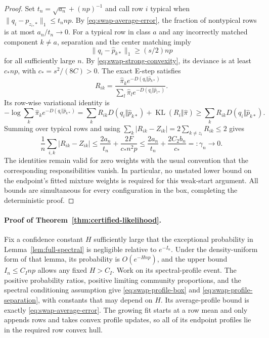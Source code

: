 \begin{proof}
Set $t_n=\sqrt{a_n}+(np)^{-1}$ and call row $i$ typical when
$\|q_i-p_{z_i,*}\|_1\le t_nnp$. By
\eqref{eq:swap-average-error}, the fraction of nontypical rows is at
most $a_n/t_n\to0$. For a typical row in class $a$ and any incorrectly
matched component $k\ne a$, separation and the center matching imply
\[
 \|q_i-\widehat p_{k*}\|_1\ge (s/2)np
\]
for all sufficiently large $n$. By \eqref{eq:swap-strong-convexity},
its deviance is at least $c_*np$, with
$c_*=s^2/(8C)>0$. The exact E-step satisfies
\[
 R_{ik}=\frac{\widehat\pi_ke^{-D(q_i\Vert\widehat p_{k*})}}
               {\sum_l\widehat\pi_le^{-D(q_i\Vert\widehat p_{l*})}}.
\]
Its row-wise variational identity is
\[
 -\log\sum_k\widehat\pi_ke^{-D(q_i\Vert\widehat p_{k*})}
 =\sum_kR_{ik}D(q_i\Vert\widehat p_{k*})
       +\operatorname{KL}(R_i\Vert\widehat\pi)
 \ge\sum_kR_{ik}D(q_i\Vert\widehat p_{k*}).
\]
Summing over typical rows and using
$\sum_k|R_{ik}-Z_{ik}|=2\sum_{k\ne z_i}R_{ik}\le2$ gives
\[
 \frac1n\sum_{i,k}|R_{ik}-Z_{ik}|
 \le\frac{2a_n}{t_n}+
       \frac{2F}{c_*n^2p}
 \le\frac{2a_n}{t_n}+\frac{2C_2b_n}{c_*}
 =:\gamma_n\longrightarrow0.
\]
The identities remain valid for zero weights with the usual convention
that the corresponding responsibilities vanish. In particular, no
unstated lower bound on the endpoint's fitted mixture weights is
required for this weak-start argument. All bounds are simultaneous for
every configuration in the box, completing the deterministic proof.
\end{proof}

\paragraph{Proof of Theorem~\ref{thm:certified-likelihood}.}
Fix a confidence constant $H$ sufficiently large that the exceptional
probability in Lemma~\ref{lem:full-spectral} is negligible relative to
$e^{-I_n}$. Under the density-uniform form of that lemma, its probability
is $O(e^{-Hnp})$, and the upper bound
$I_n\le C_I np$ allows any fixed $H>C_I$.
Work on its spectral-profile event. The positive probability ratios,
positive limiting community proportions, and the spectral conditioning
assumption give \eqref{eq:swap-profile-box} and
\eqref{eq:swap-profile-separation}, with constants that may depend on
$H$. Its average-profile bound is exactly
\eqref{eq:swap-average-error}. The growing fit starts at a row mean and
only appends rows and takes convex profile updates, so all of its
endpoint profiles lie in the required row convex hull.

